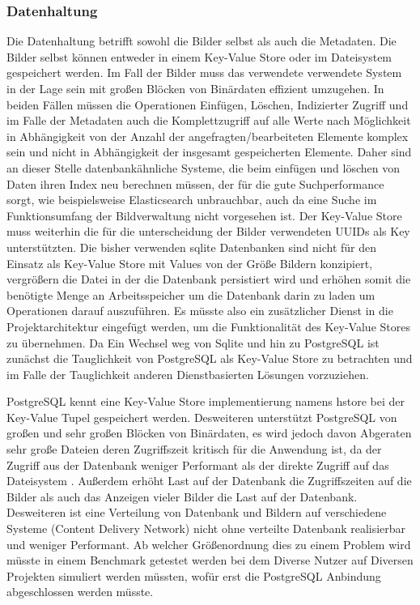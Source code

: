 \subsubsection{Datenhaltung}

Die Datenhaltung betrifft sowohl die Bilder selbst als auch die Metadaten. Die
Bilder selbst können entweder in einem Key-Value Store oder im Dateisystem
gespeichert werden. Im Fall der Bilder muss das verwendete verwendete System in
der Lage sein mit großen Blöcken von Binärdaten effizient umzugehen. In
beiden Fällen müssen die Operationen Einfügen, Löschen, Indizierter Zugriff und
im Falle der Metadaten auch die Komplettzugriff auf alle Werte nach Möglichkeit
in Abhängigkeit von der Anzahl der angefragten/bearbeiteten Elemente komplex
sein und nicht in Abhängigkeit der insgesamt gespeicherten Elemente. Daher sind
an dieser Stelle datenbankähnliche Systeme, die beim einfügen und löschen von
Daten ihren Index neu berechnen müssen, der für die gute Suchperformance sorgt,
wie beispielsweise Elasticsearch unbrauchbar, auch da eine Suche im
Funktionsumfang der Bildverwaltung nicht vorgesehen ist. Der Key-Value Store
muss weiterhin die für die unterscheidung der Bilder verwendeten UUIDs als Key
unterstützten. Die bisher verwenden sqlite Datenbanken sind nicht für den
Einsatz als Key-Value Store mit Values von der Größe Bildern konzipiert,
vergrößern die Datei in der die Datenbank persistiert wird und erhöhen somit die
benötigte Menge an Arbeitsspeicher um die Datenbank darin zu laden um
Operationen darauf auszuführen. Es müsste also ein zusätzlicher Dienst in die
Projektarchitektur eingefügt werden, um die Funktionalität des Key-Value Stores
zu übernehmen. Da Ein Wechsel weg von Sqlite und hin zu PostgreSQL ist zunächst
die Tauglichkeit von PostgreSQL als Key-Value Store zu betrachten und im Falle
der Tauglichkeit anderen Dienstbasierten Lösungen vorzuziehen.

PostgreSQL kennt eine Key-Value Store implementierung namens hstore
\cite{PostgreSQL-hstore} bei der Key-Value Tupel gespeichert werden. Desweiteren
unterstützt PostgreSQL von großen und sehr großen Blöcken von Binärdaten, es
wird jedoch davon Abgeraten sehr große Dateien deren Zugriffszeit kritisch für
die Anwendung ist, da der Zugriff aus der Datenbank weniger Performant als der
direkte Zugriff auf das Dateisystem \cite{PostgreSQL-blob}. Außerdem erhöht Last
auf der Datenbank die Zugriffszeiten auf die Bilder als auch das Anzeigen vieler
Bilder die Last auf der Datenbank. Desweiteren ist eine Verteilung von Datenbank
und Bildern auf verschiedene Systeme (Content Delivery Network) nicht ohne
verteilte Datenbank realisierbar und weniger Performant. Ab welcher
Größenordnung dies zu einem Problem wird müsste in einem Benchmark getestet
werden bei dem Diverse Nutzer auf Diversen Projekten simuliert werden müssten,
wofür erst die PostgreSQL Anbindung abgeschlossen werden müsste.

